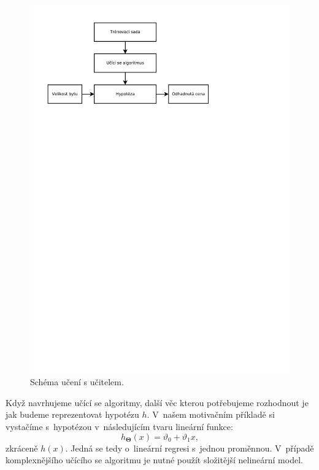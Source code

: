 \begin{figure}[!ht]
	\centering
	\includegraphics[scale = 0.5, trim = 3.5cm 42cm 14cm 2cm]{./Img/LinearniRegrese/schema.pdf}
	\caption{Schéma učení s učitelem.}
	\label{fig:schema}
\end{figure}

\par{Když navrhujeme učící se algoritmy, další věc kterou potřebujeme rozhodnout je jak budeme reprezentovat hypotézu $h$. V~našem motivačním příkladě si vystačíme s~hypotézou v~následujícím tvaru lineární funkce:
\begin{equation}
	h_{\bm{\Theta}} \left( x \right) = \vartheta_0 + \vartheta_1 x,
\end{equation}
zkráceně $h \left( x \right)$. Jedná se tedy o~lineární regresi s~jednou proměnnou. V~případě komplexnějšího učícího se algoritmu je nutné použít složitější nelineární model.}

